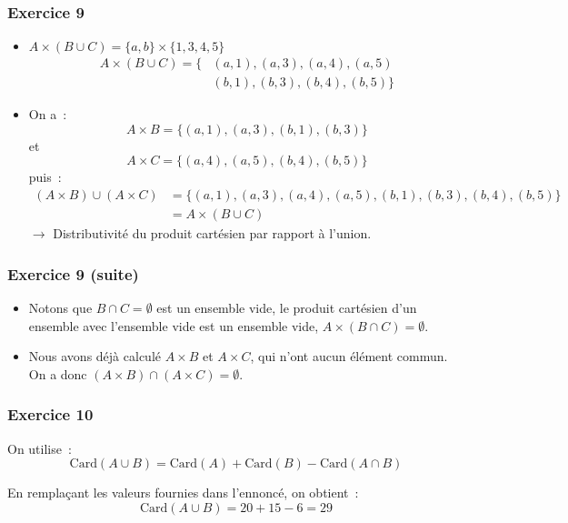 \documentclass[10pt,notheorems]{beamer}
\theoremstyle{plain}
\theoremstyle{definition} %
\begin{document}
\begin{frame}
  \frametitle{Exercice 9}
  \fontsize{8}{10}\selectfont

  \begin{itemize}

  \item $A\times (B\cup C) = \{a,b\}\times\{1,3,4,5\}$
    \[
      \begin{split}
        A\times (B\cup C) = \bigl\{ &(a, 1), (a,3), (a, 4), (a, 5)\\
        &(b, 1), (b,3), (b, 4), (b, 5)\bigr\}
      \end{split}
    \]

  \item On a~:
    \[
      A\times B = \bigl\{ (a, 1), (a,3), (b, 1), (b,3)\bigr\}
    \]
    et
    \[
      A\times C = \bigl\{ (a, 4), (a,5), (b, 4), (b,5)\bigr\}
    \]
    puis~:
    \[
      \begin{split}
        (A\times B)\cup(A\times C) &= \bigl\{(a, 1), (a,3), (a, 4), (a, 5), (b, 1), (b,3), (b, 4), (b, 5)\bigr\}\\
        &= A\times (B\cup C)
      \end{split}
    \]
    $\rightarrow$ Distributivité du produit cartésien par rapport à l'union.  
  \end{itemize}
  
\end{frame}


\begin{frame}
  \frametitle{Exercice 9 (suite)}
  \fontsize{8}{10}\selectfont

  \begin{itemize}

  \item Notons que $B\cap C = \emptyset$ est un ensemble vide, le produit cartésien d'un ensemble avec l'ensemble vide est un ensemble vide, $A\times (B\cap C) = \emptyset$.\newline

  \item Nous avons déjà calculé $A\times B$ et $A\times C$, qui n'ont aucun élément commun. On a donc
    $(A\times B)\cap(A\times C) = \emptyset$.
  \end{itemize}
  
\end{frame}


\begin{frame}
  \frametitle{Exercice 10}
  \fontsize{8}{10}\selectfont


  On utilise~:
    \[
      \textrm{Card}(A \cup B) = \textrm{Card}(A) + \textrm{Card}(B) - \textrm{Card}(A\cap B) 
    \]

    En remplaçant les valeurs fournies dans l'ennoncé, on obtient~:
    \[
      \textrm{Card}(A \cup B) = 20+15-6 = 29
    \]
    
  
\end{frame}
\end{document}
